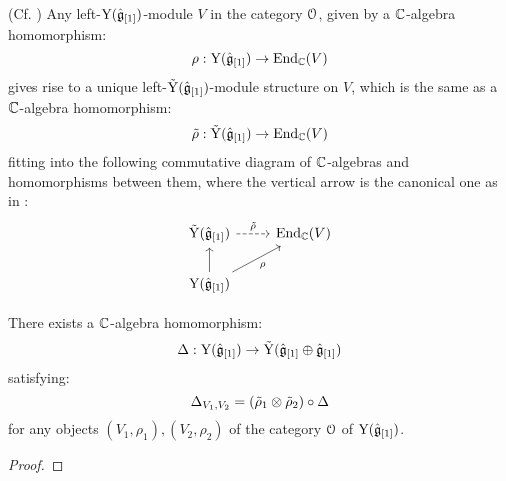         \begin{lemma} \label{lemma: lifting_representations_to_root_grading_completions}
            (Cf. \cite[Proposition 5.14]{guay_nakajima_wendlandt_affine_yangian_coproduct}) Any left-$\mathrm{Y}(\hat{\mathfrak{g}}_{[1]})$-module $V$ in the category $\mathcal{O}$, given by a $\mathbb{C}$-algebra homomorphism:
                $$\rho: \mathrm{Y}(\hat{\mathfrak{g}}_{[1]}) \to \mathrm{End}_{\mathbb{C}}(V)$$
            gives rise to a unique left-$\tilde{\mathrm{Y}}(\hat{\mathfrak{g}}_{[1]})$-module structure on $V$, which is the same as a $\mathbb{C}$-algebra homomorphism:
                $$\tilde{\rho}: \tilde{\mathrm{Y}}(\hat{\mathfrak{g}}_{[1]}) \to \mathrm{End}_{\mathbb{C}}(V)$$
            fitting into the following commutative diagram of $\mathbb{C}$-algebras and homomorphisms between them, where the vertical arrow is the canonical one as in \cite[Section 5, Lemma 5.3]{guay_nakajima_wendlandt_affine_yangian_coproduct}:
                $$
                    \begin{tikzcd}
                	{\tilde{\rmY}(\hat{\g}_{[1]})} & {\End_{\bbC}(V)} \\
                	{\rmY(\hat{\g}_{[1]})}
                	\arrow[from=2-1, to=1-1]
                	\arrow["{\tilde{\rho}}", dashed, from=1-1, to=1-2]
                	\arrow["\rho"', from=2-1, to=1-2]
                    \end{tikzcd}
                $$
        \end{lemma}
        \begin{proposition} \label{prop: hopf_coproduct_on_yangians}
            There exists a $\mathbb{C}$-algebra homomorphism:
                $$\Delta: \mathrm{Y}(\hat{\mathfrak{g}}_{[1]}) \to \tilde{\mathrm{Y}}(\hat{\mathfrak{g}}_{[1]} \oplus \hat{\mathfrak{g}}_{[1]})$$
            satisfying:
                $$\Delta_{V_1, V_2} = (\tilde{\rho}_1 \tensor \tilde{\rho}_2) \circ \Delta$$
            for any objects $(V_1, \rho_1), (V_2, \rho_2)$ of the category $\mathcal{O}$ of $\mathrm{Y}(\hat{\mathfrak{g}}_{[1]})$.
        \end{proposition}
            \begin{proof}
                
            \end{proof}
        
